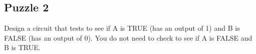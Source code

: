 \subsection*{Puzzle 2}

Design a circuit that tests to see if A is TRUE (has an output of 1) and B is FALSE (has an output of 0). You do not need to check to see if A is FALSE and B is TRUE.

